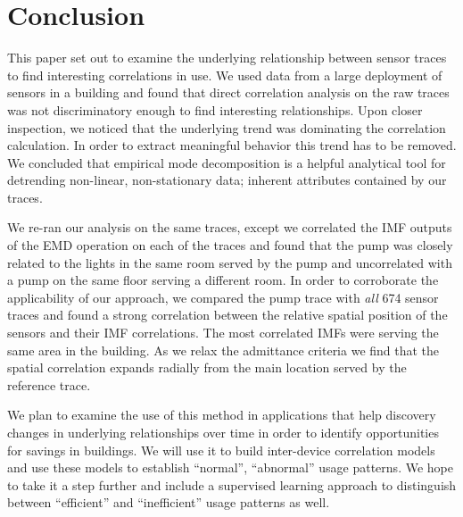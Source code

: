 



\section{Conclusion}





This paper set out to examine the underlying relationship between sensor traces to find interesting correlations
in use.  We used data from a large deployment of sensors in a building and found that direct correlation analysis on the raw
traces was not discriminatory enough to find interesting relationships.  Upon closer inspection, we noticed that
the underlying trend was dominating the correlation calculation.  In order to extract meaningful behavior this trend has
to be removed.  We concluded that empirical mode decomposition is a helpful analytical tool for detrending 
non-linear, non-stationary data; inherent attributes contained by our traces.

We re-ran our analysis on the same traces, except we correlated the IMF outputs of the EMD operation on each of the traces and found that the pump was closely related to the lights in the same room served by the pump and
uncorrelated with a pump on the same floor serving a different room.  In order to corroborate the applicability
of our approach, we compared the pump trace with \emph{all} 674 sensor traces and found a strong correlation
between the relative spatial position of the sensors and their IMF correlations.  The most correlated IMFs were 
serving the same
area in the building.  As we relax the admittance criteria we find that the spatial correlation expands radially from
the main location served by the reference trace.

We plan to examine the use of this method in applications that help discovery changes in underlying relationships over time
in order to identify opportunities for savings in buildings.  We will use it to build inter-device correlation models
and use these models to establish ``normal'', ``abnormal'' usage patterns.  We hope to take it a step further and include a
supervised learning approach to distinguish between ``efficient'' and ``inefficient'' usage patterns as well.







